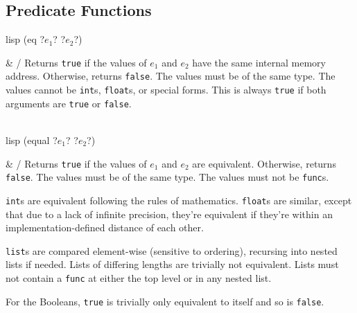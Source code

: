 \subsection{Predicate Functions}
\begin{funcdefs}
    \begin{minipage}[t]{\linewidth}
        \centering
        \begin{cminted}[autogobble=true, escapeinside=??]{lisp}
            (eq ?$e_1$? ?$e_2$?)
        \end{cminted}
    \end{minipage}
    & \specialf/ Returns \texttt{true} if the values of $e_1$ and $e_2$ have the same internal memory address. Otherwise, returns \texttt{false}. The values must be of the same type. The values cannot be \texttt{int}s, \texttt{float}s, or special forms. This is always \texttt{true} if both arguments are \texttt{true} or \texttt{false}.
    \\ \\
    \begin{minipage}[t]{\linewidth}
        \centering
        \begin{cminted}[autogobble=true, escapeinside=??]{lisp}
            (equal ?$e_1$? ?$e_2$?)
        \end{cminted}
    \end{minipage}
    & \specialf/ Returns \texttt{true} if the values of $e_1$ and $e_2$ are equivalent. Otherwise, returns \texttt{false}. The values must be of the same type. The values must not be \texttt{func}s.
    \setlength{\parindent}{1.5em}%
    \par\indent%
    \texttt{int}s are equivalent following the rules of mathematics. \texttt{float}s are similar, except that due to a lack of infinite precision, they're equivalent if they're within an implementation-defined distance of each other.
    \par\indent%
    \texttt{list}s are compared element-wise (sensitive to ordering), recursing into nested lists if needed. Lists of differing lengths are trivially not equivalent. Lists must not contain a \texttt{func} at either the top level or in any nested list.
    \par\indent%
    For the Booleans, \texttt{true} is trivially only equivalent to itself and so is \texttt{false}.
\end{funcdefs}

